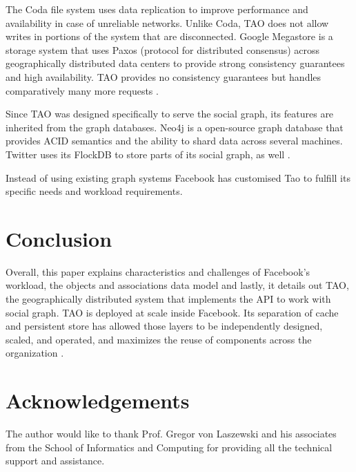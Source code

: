 \documentclass[9pt,twocolumn,twoside]{../../styles/osajnl}
\begin{document}
The Coda file system uses data replication to improve performance and availability in case of unreliable networks. Unlike Coda, TAO does not allow writes in portions of the system that are disconnected. Google Megastore is a storage system that uses Paxos (protocol for distributed consensus) across geographically distributed data centers to provide strong consistency guarantees and high availability. TAO provides no consistency guarantees but handles comparatively many more requests \cite{book-tao1}.

Since TAO was designed specifically to serve the social graph, its features are inherited from the graph databases. Neo4j is a open-source graph database that provides ACID semantics and the ability to shard data across several machines. Twitter uses its FlockDB to store parts of its social graph, as well \cite{book-tao1}. 

Instead of using existing graph systems Facebook has customised Tao to fulfill its specific needs and workload requirements.

\section{Conclusion}

Overall, this paper explains characteristics and challenges of Facebook's workload, the objects and associations data model and lastly, it details out TAO, the geographically distributed system that implements the API to work with social graph. TAO is deployed at scale inside Facebook. Its separation of cache and persistent store has allowed those layers to be independently designed, scaled, and operated, and maximizes the reuse of components across the organization \cite{book-tao1}.

\section {Acknowledgements}
The author would like to thank Prof. Gregor von Laszewski and his associates from the School of Informatics and Computing for providing all the technical support and assistance.



\end{document}
